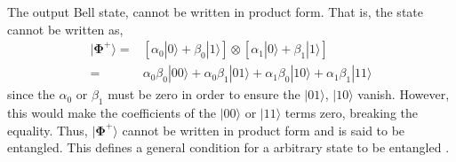 
The output Bell state, cannot be written in product form. That is, the state cannot be written as,
\begin{align*}
    |{\bm\Phi}^+\rangle = & \left[ \alpha_0 |0\rangle + \beta_0|1\rangle\right] \otimes \left[\alpha_1 |0\rangle + \beta_1|1\rangle\right] \\
    =                     & \alpha_0\beta_0 |00\rangle + \alpha_0\beta_1|01\rangle + \alpha_1\beta_0|10\rangle + \alpha_1\beta_1|11\rangle
\end{align*}
since the $\alpha_0$ or $\beta_1$ must be zero in order to ensure the $|01\rangle$, $|10\rangle$ vanish.
However, this would make the coefficients of the $|00\rangle$
or $|11\rangle$ terms zero, breaking the equality. Thus, $|{\bm\Phi}^+\rangle$ cannot be written in
product form and is said to be entangled. This defines a general condition for a arbitrary state to be entangled \cite{nielsen_chuang_2010}.
